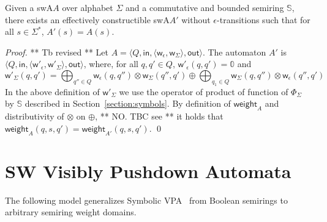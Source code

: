 \documentclass[runningheads]{llncs}
\def\<#1>{\langle #1 \rangle}
\newcommand{\Semiring}{\mathbb{S}}
\newcommand{\zero}{\mathbb{0}}
\def\SWA{\textsf{swA}\xspace}
\def\weight{\mathsf{weight}}
\def\wei{\mathsf{w}}
\def\init{\mathsf{in}}
\def\final{\mathsf{out}}
\begin{document}
\begin{proposition}
Given a \SWA $A$ over alphabet $\Sigma$ 
and a commutative and bounded semiring $\Semiring$, 
there exists an effectively constructible \SWA $A'$ 
without $\epsilon$-transitions 
such that for all $s \in \Sigma^*$, $A'(s) = A(s)$.
\end{proposition}
%
\begin{proof}  ** Tb revised **   
Let $A = \< Q, \init, \<\wei_\epsilon, \wei_\Sigma>, \final >$.
The automaton $A'$ is $\< Q, \init, \<\wei'_\epsilon, \wei'_\Sigma>, \final >$,
where, for all $q, q' \in Q$,
$\wei'_\epsilon(q, q') = \zero$  
and 
\[
\wei'_\Sigma(q, q') = 
\displaystyle\bigoplus_{q'' \in Q} \wei_\epsilon(q, q'') \otimes \wei_\Sigma(q'', q')
\oplus \displaystyle\bigoplus_{q_1 \in Q} \wei_\Sigma(q, q'') \otimes \wei_\epsilon(q'', q')
\]
In the above definition of $\wei'_\Sigma$ we use the operator
of product of function of $\Phi_\Sigma$ by $\Semiring$ 
described in Section~\ref{section:symbols}.
%
By definition of $\weight_{A}$ and distributivity of $\otimes$ on $\oplus$, 
** NO. TBC see \cite{Mohri02ijfcs} **
it holds that $\weight_{A}(q, s, q') = \weight_{A'}(q, s, q')$.
\qed
\end{proof}     










\section{SW Visibly Pushdown Automata}
\label{section:SWVPA}\label{sec:SWVPA}
The following model generalizes Symbolic VPA~\cite{dAntonyAlur14SVPDA}
from Boolean semirings to arbitrary semiring weight domains.
\end{document}
